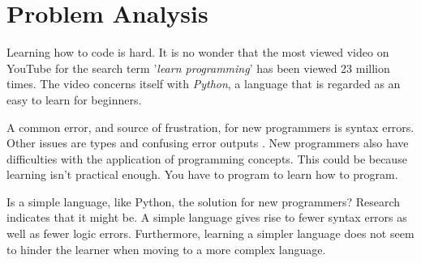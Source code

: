 \chapter{Problem Analysis} \label{chap:analysis}
Learning how to code is hard.
It is no wonder that the most viewed video on YouTube for the search term '\textit{learn programming}' has been viewed 23 million times\cite{LearnProgrammingYouTube}.
The video concerns itself with \textit{Python}, a language that is regarded as an easy to learn for beginners\cite{PythonBeginners}.

A common error, and source of frustration, for new programmers is syntax errors.
Other issues are types and confusing error outputs \cite{bosseWhyProgrammingDifficult2017}.
New programmers also have difficulties with the application of programming concepts.
This could be because learning isn't practical enough\cite{lahtinenStudyDifficultiesNovice2005}.
You have to program to learn how to program.

Is a simple language, like Python\cite{WhatPythonExecutive}, the solution for new programmers?
Research indicates that it might be. A simple language gives rise to fewer syntax errors as well as fewer logic errors.
Furthermore, learning a simpler language does not seem to hinder the learner when moving to a more complex language\cite{mannilaWhatSimpleLanguage2006}.

